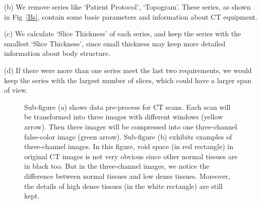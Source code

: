 \documentclass[journal]{IEEEtran}
\begin{document}
(b) We remove series like `Patient Protocol', `Topogram'. These series, as shown in Fig~\ref{Bs}, contain some basic parameters and information about CT equipment.

(c) We calculate `Slice Thickness' of each series, and keep the series with the smallest `Slice Thickness', since small thickness may keep more detailed information about body structure. 

(d) If there were more than one series meet the last two requirements, we would keep the series with the largest number of slices, which could have a larger span of view.
\begin{figure}[htbp]
    \centering

    \centering
    \caption{Sub-figure (a) shows data pre-process for CT scans. Each scan will be transformed into three images with different windows (yellow arrow). Then three images will be compressed into one three-channel false-color image (green arrow).
    Sub-figure (b) exhibits examples of three-channel images. In this figure, void space (in red rectangle) in original CT images is not very obvious since other normal tissues are in black too. But in the three-channel images, we notice the difference between normal tissues and low dense tissues. Moreover, the details of high dense tissues (in the white rectangle) are still kept.
    }
    \label{3channel}
    \end{figure}
\end{document}
